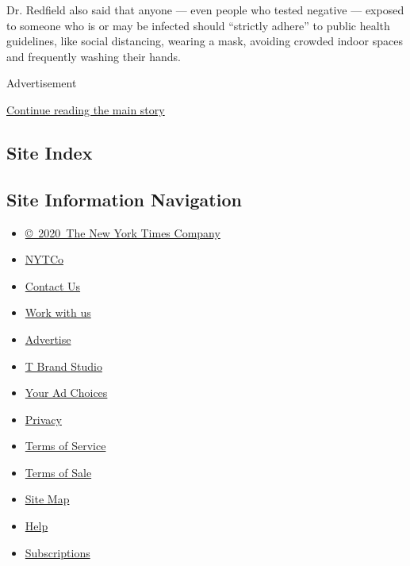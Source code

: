 Dr. Redfield also said that anyone --- even people who tested negative
--- exposed to someone who is or may be infected should ``strictly
adhere'' to public health guidelines, like social distancing, wearing a
mask, avoiding crowded indoor spaces and frequently washing their hands.

Advertisement

\protect\hyperlink{after-bottom}{Continue reading the main story}

\hypertarget{site-index}{%
\subsection{Site Index}\label{site-index}}

\hypertarget{site-information-navigation}{%
\subsection{Site Information
Navigation}\label{site-information-navigation}}

\begin{itemize}
\tightlist
\item
  \href{https://help.nytimes3xbfgragh.onion/hc/en-us/articles/115014792127-Copyright-notice}{©~2020~The
  New York Times Company}
\end{itemize}

\begin{itemize}
\tightlist
\item
  \href{https://www.nytco.com/}{NYTCo}
\item
  \href{https://help.nytimes3xbfgragh.onion/hc/en-us/articles/115015385887-Contact-Us}{Contact
  Us}
\item
  \href{https://www.nytco.com/careers/}{Work with us}
\item
  \href{https://nytmediakit.com/}{Advertise}
\item
  \href{http://www.tbrandstudio.com/}{T Brand Studio}
\item
  \href{https://www.nytimes3xbfgragh.onion/privacy/cookie-policy\#how-do-i-manage-trackers}{Your
  Ad Choices}
\item
  \href{https://www.nytimes3xbfgragh.onion/privacy}{Privacy}
\item
  \href{https://help.nytimes3xbfgragh.onion/hc/en-us/articles/115014893428-Terms-of-service}{Terms
  of Service}
\item
  \href{https://help.nytimes3xbfgragh.onion/hc/en-us/articles/115014893968-Terms-of-sale}{Terms
  of Sale}
\item
  \href{https://spiderbites.nytimes3xbfgragh.onion}{Site Map}
\item
  \href{https://help.nytimes3xbfgragh.onion/hc/en-us}{Help}
\item
  \href{https://www.nytimes3xbfgragh.onion/subscription?campaignId=37WXW}{Subscriptions}
\end{itemize}
